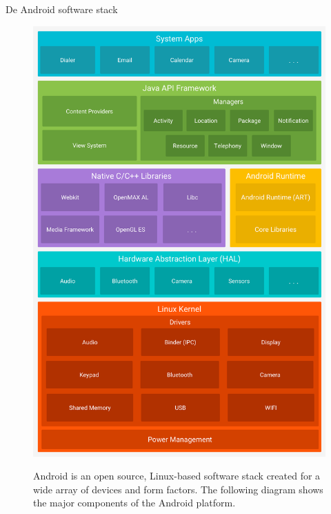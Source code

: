 \documentclass{beamer}
\begin{document}
\begin{frame}{De Android software stack }
\begin{figure}[ht]
	\centering
	\includegraphics[height=\textheight]{img/hello/android-stack.png}
	\label{fig:stack}
	\caption{Android is an open source, Linux-based software stack created for a wide array of devices and form factors. The following diagram shows the major components of the Android platform.}
\end{figure}	
\end{frame}
\end{document}
